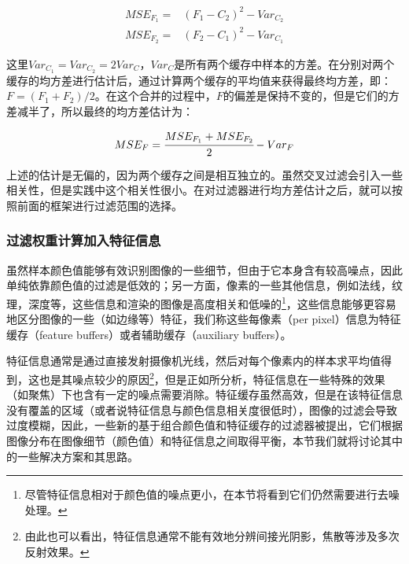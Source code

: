 \begin{equation}
	\begin{aligned}
		MSE_{F_1}=&(F_1-C_2)^{2}-Var_{C_2}\\
		MSE_{F_2}=&(F_2-C_1)^{2}-Var_{C_1}
	\end{aligned}
\end{equation}

这里$Var_{C_1}=Var_{C_2}=2Var_C$，$Var_C$是所有两个缓存中样本的方差。在分别对两个缓存的均方差进行估计后，通过计算两个缓存的平均值来获得最终均方差，即：$F=(F_1+F_2)/2$。在这个合并的过程中，$F$的偏差是保持不变的，但是它们的方差减半了，所以最终的均方差估计为：

\begin{equation}
	MSE_F= \cfrac{MSE_{F_1}+MSE_{F_2}}{2}-Var_F
\end{equation}

上述的估计是无偏的，因为两个缓存之间是相互独立的。虽然交叉过滤会引入一些相关性，但是实践中这个相关性很小。在对过滤器进行均方差估计之后，就可以按照前面的框架进行过滤范围的选择。







\subsubsection{过滤权重计算加入特征信息}\label{sec:pt-feature-filtering}
虽然样本颜色值能够有效识别图像的一些细节，但由于它本身含有较高噪点，因此单纯依靠颜色值的过滤是低效的；另一方面，像素的一些其他信息，例如法线，纹理，深度等，这些信息和渲染的图像是高度相关和低噪的\footnote{尽管特征信息相对于颜色值的噪点更小，在本节将看到它们仍然需要进行去噪处理。}，这些信息能够更容易地区分图像的一些（如边缘等）特征，我们称这些每像素（per pixel）信息为特征缓存（feature buffers）或者辅助缓存（auxiliary buffers）。

特征信息通常是通过直接发射摄像机光线，然后对每个像素内的样本求平均值得到，这也是其噪点较少的原因\footnote{由此也可以看出，特征信息通常不能有效地分辨间接光阴影，焦散等涉及多次反射效果。}，但是正如\cite{a:OnFilteringtheNoisefromtheRandomParametersinMonteCarloRendering}所分析，特征信息在一些特殊的效果（如聚焦）下也含有一定的噪点需要消除。特征缓存虽然高效，但是在该特征信息没有覆盖的区域（或者说特征信息与颜色信息相关度很低时），图像的过滤会导致过度模糊，因此，一些新的基于组合颜色值和特征缓存的过滤器被提出，它们根据图像分布在图像细节（颜色值）和特征信息之间取得平衡，本节我们就将讨论其中的一些解决方案和其思路。

